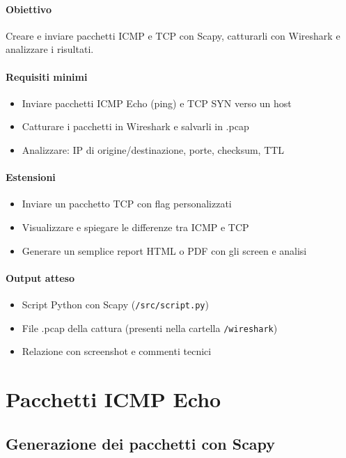 \documentclass[12pt,a4paper]{report}
\begin{document}
\subsubsection{Obiettivo}
Creare e inviare pacchetti ICMP e TCP con Scapy, catturarli con Wireshark e analizzare i risultati.

\subsubsection{Requisiti minimi}
\begin{itemize}
	\item Inviare pacchetti ICMP Echo (ping) e TCP SYN verso un host
	\item Catturare i pacchetti in Wireshark e salvarli in .pcap
	\item Analizzare: IP di origine/destinazione, porte, checksum, TTL
\end{itemize}

\subsubsection{Estensioni}
\begin{itemize}
	\item Inviare un pacchetto TCP con flag personalizzati
	\item Visualizzare e spiegare le differenze tra ICMP e TCP
	\item Generare un semplice report HTML o PDF con gli screen e analisi
\end{itemize}

\subsubsection{Output atteso}

\begin{itemize}
	\item Script Python con Scapy (\texttt{/src/script.py})
	\item File .pcap della cattura (presenti nella cartella \texttt{/wireshark})
	\item Relazione con screenshot e commenti tecnici
\end{itemize}

\chapter{Pacchetti ICMP Echo}

\section{Generazione dei pacchetti con Scapy}
\end{document}
